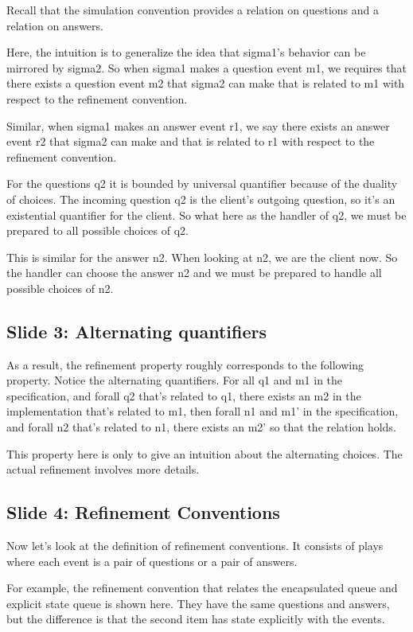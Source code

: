 \documentclass{article}
\begin{document}
Recall that the simulation convention provides a relation on questions and a
relation on answers.

Here, the intuition is to generalize the idea that sigma1's behavior can be
mirrored by sigma2. So when sigma1 makes a question event m1, we requires that
there exists a question event m2 that sigma2 can make that is related to m1 with
respect to the refinement convention.

Similar, when sigma1 makes an answer event r1, we say there exists an answer
event r2 that sigma2 can make and that is related to r1 with respect to the
refinement convention.

For the questions q2 it is bounded by universal quantifier because of the
duality of choices. The incoming question q2 is the client's outgoing question,
so it's an existential quantifier for the client. So what here as the handler of
q2, we must be prepared to all possible choices of q2.

This is similar for the answer n2. When looking at n2, we are the client now.
So the handler can choose the answer n2 and we must be prepared to handle all
possible choices of n2.

\subsection{Slide 3: Alternating quantifiers}

As a result, the refinement property roughly corresponds
to the following property. Notice the alternating quantifiers.
For all q1 and m1 in the specification,
and forall q2 that's related to q1,
there exists an m2 in the implementation that's related to m1,
then forall n1 and m1' in the specification,
and forall n2 that's related to n1,
there exists an m2' so that the relation holds.

This property here is only to give an intuition about the alternating choices.
The actual refinement involves more details.

\subsection{Slide 4: Refinement Conventions}

Now let's look at the definition of refinement conventions. It consists of plays
where each event is a pair of questions or a pair of answers.

For example, the refinement convention that relates the encapsulated queue and
explicit state queue is shown here. They have the same questions and answers,
but the difference is that the second item has state explicitly with the events.
\end{document}
